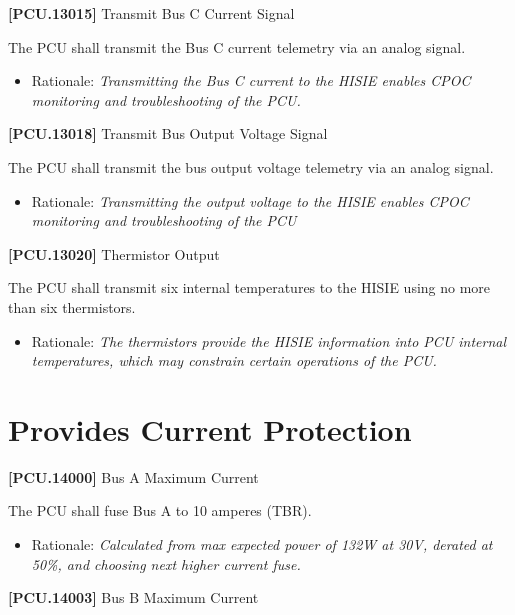 \textbf{[PCU.13015]} Transmit Bus C Current Signal

The \gls{PCU} shall transmit the Bus C current telemetry via an analog signal.

\begin{itemize}
\item{} Rationale: \emph{Transmitting the Bus C current to the HISIE enables CPOC monitoring and troubleshooting of the PCU.}

\end{itemize}

\textbf{[PCU.13018]} Transmit Bus Output Voltage Signal

The \gls{PCU} shall transmit the bus output voltage telemetry via an analog signal.

\begin{itemize}
\item{} Rationale: \emph{Transmitting the output voltage to the HISIE enables CPOC monitoring and troubleshooting of the PCU}

\end{itemize}

\textbf{[PCU.13020]} Thermistor Output

The \gls{PCU} shall transmit six internal temperatures to the \gls{HISIE} using no more than six thermistors.

\begin{itemize}
\item{} Rationale: \emph{The thermistors provide the HISIE information into PCU internal temperatures, which may constrain certain operations of the PCU.}

\end{itemize}

\section{Provides Current Protection}
\label{providescurrentprotection}

\textbf{[PCU.14000]} Bus A Maximum Current

The \gls{PCU} shall fuse Bus A to 10 amperes (TBR\label{tbx_7}).

\begin{itemize}
\item{} Rationale: \emph{Calculated from max expected power of 132W at 30V, derated at 50\%, and choosing next higher current fuse.}

\end{itemize}

\textbf{[PCU.14003]} Bus B Maximum Current

